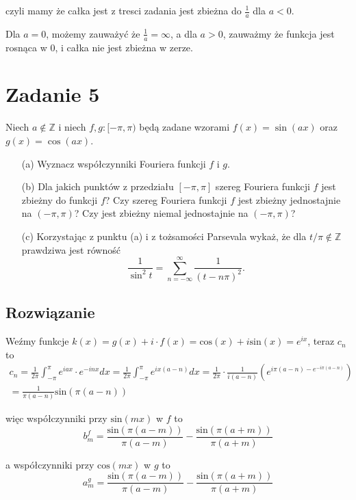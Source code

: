 \documentclass[11pt]{scrartcl}
\begin{document}
czyli mamy że całka jest z tresci zadania jest zbieżna do $\frac{1}{a}$ dla $a < 0$.

Dla $a = 0$, możemy zauważyć że $\frac{1}{a} = \infty $, a dla $a > 0$, zauważmy że funkcja jest rosnąca w $0$, i całka nie jest zbieżna w zerze.
\section*{Zadanie 5}
Niech \(a \notin \mathbb{Z}\) i niech \(f, g : [-\pi, \pi)\) będą zadane wzorami \(f(x) = \sin(ax)\) oraz \(g(x) = \cos(ax)\).
\begin{itemize}
    \item[(a)] Wyznacz współczynniki Fouriera funkcji \(f\) i \(g\).
    \item[(b)] Dla jakich punktów z przedziału \([- \pi, \pi]\) szereg Fouriera funkcji \(f\) jest zbieżny do funkcji \(f\)? Czy szereg Fouriera funkcji \(f\) jest zbieżny jednostajnie na \((- \pi, \pi)\)? Czy jest zbieżny niemal jednostajnie na \((- \pi, \pi)\)?
    \item[(c)] Korzystając z punktu (a) i z tożsamości Parsevala wykaż, że dla \(t / \pi \notin \mathbb{Z}\) prawdziwa jest równość
    \[
    \frac{1}{\sin^2 t} = \sum_{n = -\infty}^{\infty} \frac{1}{(t - n\pi)^2}.
    \]
\end{itemize}

\subsection*{Rozwiązanie}

Weźmy funkcje $k(x) = g(x) + i \cdot f(x) = \text{cos} \left ( x \right ) + i \text{sin} \left ( x \right ) = e^{ix} $, teraz $c_n$ to 
\begin{gather*}
  c_n = \frac{1}{2 \pi} \int_{- \pi}^{\pi} e^{iax} \cdot e^{-inx} dx = \frac{1}{2 \pi} \int_{-\pi }^{\pi } e^{ix(a-n)} dx = \frac{1}{2 \pi } \cdot \frac{1}{i(a-n)} \left ( e^{i \pi (a - n)  - e^{- i \pi (a-n)}} \right ) \\
  = \frac{1}{\pi (a - n)} \text{sin} \left ( \pi (a-n)  \right )
\end{gather*}

więc współczynniki przy $\text{sin} \left ( mx \right ) $ w $f$ to 
\[
    b^f_m = \frac{\text{sin} \left ( \pi (a-m) \right ) }{\pi (a-m)} - \frac{\text{sin} \left ( \pi (a+m) \right ) }{\pi (a+m)}
\]

a współczynniki przy $\text{cos} \left ( mx \right ) $ w $g$ to 
\[
    a^g_m = \frac{\text{sin} \left ( \pi (a-m) \right ) }{\pi (a-m)} - \frac{\text{sin} \left ( \pi (a+m) \right ) }{\pi (a+m)} 
\]
\end{document}
